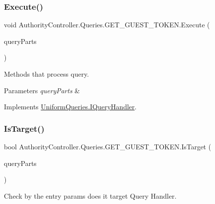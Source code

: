 \subsubsection{\texorpdfstring{Execute()}{Execute()}}
{\footnotesize\ttfamily void Authority\+Controller.\+Queries.\+G\+E\+T\+\_\+\+G\+U\+E\+S\+T\+\_\+\+T\+O\+K\+E\+N.\+Execute (\begin{DoxyParamCaption}\item[{\mbox{\hyperlink{struct_uniform_queries_1_1_query_part}{Query\+Part}} \mbox{[}$\,$\mbox{]}}]{query\+Parts }\end{DoxyParamCaption})}



Methods that process query. 


\begin{DoxyParams}{Parameters}
{\em query\+Parts} & \\
\hline
\end{DoxyParams}


Implements \mbox{\hyperlink{interface_uniform_queries_1_1_i_query_handler_a66d15db03bdd5b0caf6eef96f9b803c0}{Uniform\+Queries.\+I\+Query\+Handler}}.

\mbox{\label{class_authority_controller_1_1_queries_1_1_g_e_t___g_u_e_s_t___t_o_k_e_n_a5606c5797e0a684a6bfbbd851f186268}} 
\subsubsection{\texorpdfstring{Is\+Target()}{IsTarget()}}
{\footnotesize\ttfamily bool Authority\+Controller.\+Queries.\+G\+E\+T\+\_\+\+G\+U\+E\+S\+T\+\_\+\+T\+O\+K\+E\+N.\+Is\+Target (\begin{DoxyParamCaption}\item[{\mbox{\hyperlink{struct_uniform_queries_1_1_query_part}{Query\+Part}} \mbox{[}$\,$\mbox{]}}]{query\+Parts }\end{DoxyParamCaption})}



Check by the entry params does it target Query Handler. 


